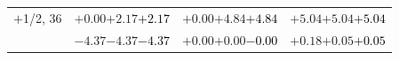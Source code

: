 \documentclass[compress]{beamer}
\begin{document}
\begin{frame}
\begin{tabular}{r | c | c | c}
$+$1/2, 36 & $+0.00$\hspace{0.1 cm}$+2.17$\hspace{0.1 cm}\textcolor{black}{$+2.17$} & $+0.00$\hspace{0.1 cm}$+4.84$\hspace{0.1 cm}\textcolor{black}{$+4.84$} & $+5.04$\hspace{0.1 cm}$+5.04$\hspace{0.1 cm}\textcolor{black}{$+5.04$} \\
           & $-4.37$\hspace{0.1 cm}$-4.37$\hspace{0.1 cm}\textcolor{black}{$-4.37$} & $+0.00$\hspace{0.1 cm}$+0.00$\hspace{0.1 cm}\textcolor{black}{$-0.00$} & $+0.18$\hspace{0.1 cm}$+0.05$\hspace{0.1 cm}\textcolor{black}{$+0.05$} \\
\end{tabular}
\end{frame}
\end{document}
